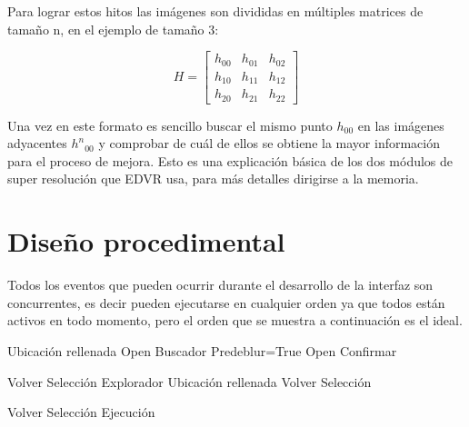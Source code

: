 Para lograr estos hitos las imágenes son divididas en múltiples matrices de tamaño n, en el ejemplo de tamaño 3:

        \begin{equation*}
        H = \begin{bmatrix}
            h_{00} & h_{01} & h_{02}\\
            h_{10} & h_{11} & h_{12}\\
            h_{20} & h_{21} & h_{22}
            \end{bmatrix}
        \end{equation*}

Una vez en este formato es sencillo buscar el mismo punto $h_{00}$ en las imágenes adyacentes ${h^n}_{00}$ y comprobar de cuál de ellos se obtiene la mayor información para el proceso de mejora.
Esto es una explicación básica de los dos módulos de super resolución que EDVR usa, para más detalles dirigirse a la memoria. 

\section{Diseño procedimental}

Todos los eventos que pueden ocurrir durante el desarrollo  de la interfaz son concurrentes, es decir pueden ejecutarse en cualquier orden ya que todos están activos en todo momento, pero el orden que se muestra a continuación es el ideal. 

\FloatBarrier
\begin{algorithm}[!h]
{
{
Ubicación rellenada
}
{
Open Buscador
}
{
Predeblur=True
 }
{
Open Confirmar
}
}	
\caption{Proceso de Selección de vídeo }
\end{algorithm}
\FloatBarrier

\FloatBarrier
\begin{algorithm}[!h]
{
Volver Selección
}
{
Explorador
}
{
Ubicación rellenada
Volver Selección
 }	
\caption{Proceso de Búsqueda de vídeos }
\end{algorithm}
\FloatBarrier

\FloatBarrier
\begin{algorithm}[!h]
{
Volver Selección
}
{
Ejecución
}
\caption{Proceso de Confirmación de ejecución  }
\end{algorithm}
\FloatBarrier

